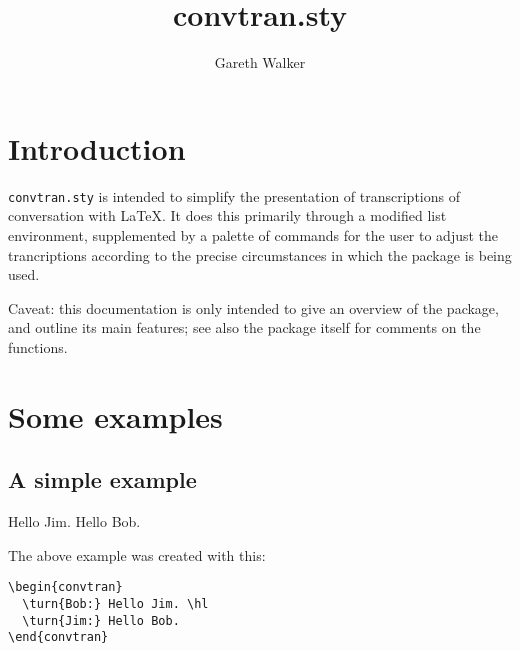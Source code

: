 \documentclass[a4paper]{article}
\begin{document}
\title{convtran.sty}
\author{Gareth Walker}
\maketitle
\tableofcontents
\setlength{\parskip}{1em}
\setlength{\parindent}{0em}

\section{Introduction}

\verb!convtran.sty! is intended to simplify the presentation of
transcriptions of conversation with \LaTeX.  It does this primarily
through a modified list environment, supplemented by a palette of
commands for the user to adjust the trancriptions according to the
precise circumstances in which the package is being used.

Caveat: this documentation is only intended to give an overview of the
package, and outline its main features; see also the package itself
for comments on the functions.

\section{Some examples}

\subsection{A simple example}
\begin{convtran}
   Hello Jim. \hl
   Hello Bob.
\end{convtran}
\noindent The above example was created with this:
\begin{verbatim}
\begin{convtran}
  \turn{Bob:} Hello Jim. \hl
  \turn{Jim:} Hello Bob.
\end{convtran}
\end{verbatim}
\end{document}
